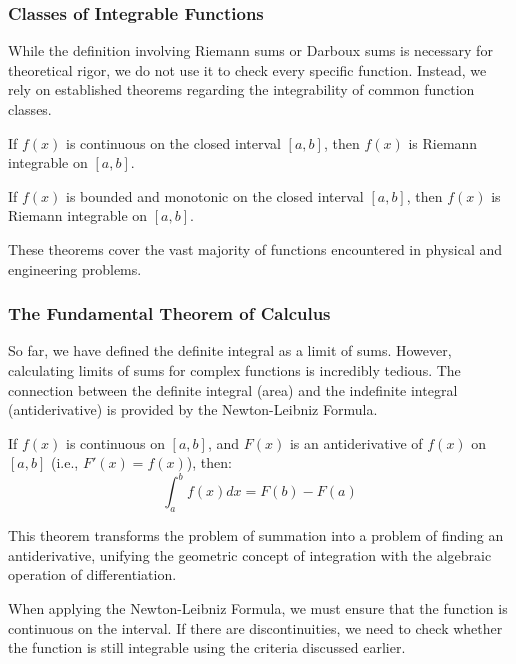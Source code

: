\subsubsection{Classes of Integrable Functions}

While the definition involving Riemann sums or Darboux sums is necessary for theoretical rigor, we do not use it to check every specific function. Instead, we rely on established theorems regarding the integrability of common function classes.

\begin{theorem}
If $f(x)$ is continuous on the closed interval $[a,b]$, then $f(x)$ is Riemann integrable on $[a,b]$.
\end{theorem}

\begin{theorem}
If $f(x)$ is bounded and monotonic on the closed interval $[a,b]$, then $f(x)$ is Riemann integrable on $[a,b]$.
\end{theorem}

These theorems cover the vast majority of functions encountered in physical and engineering problems.

\subsubsection{The Fundamental Theorem of Calculus}

So far, we have defined the definite integral as a limit of sums. However, calculating limits of sums for complex functions is incredibly tedious. The connection between the definite integral (area) and the indefinite integral (antiderivative) is provided by the Newton-Leibniz Formula.

\begin{theorem}
If $f(x)$ is continuous on $[a,b]$, and $F(x)$ is an antiderivative of $f(x)$ on $[a,b]$ (i.e., $F'(x) = f(x)$), then:
\[
\int_a^b f(x) dx = F(b) - F(a)
\]
\end{theorem}

This theorem transforms the problem of summation into a problem of finding an antiderivative, unifying the geometric concept of integration with the algebraic operation of differentiation.

When applying the Newton-Leibniz Formula, we must ensure that the function is continuous on the interval. If there are discontinuities, we need to check whether the function is still integrable using the criteria discussed earlier.

